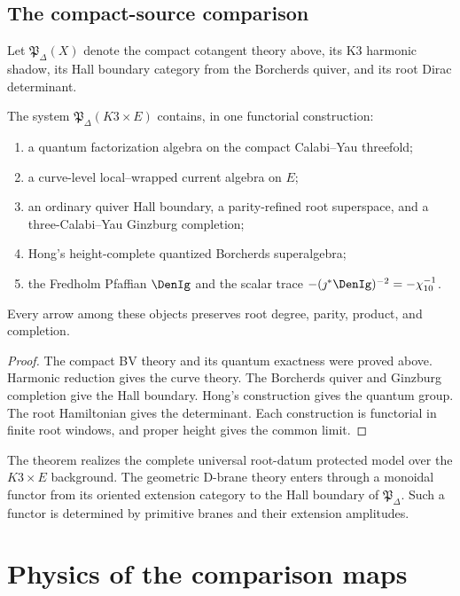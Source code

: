 \chapter{The compact-source comparison}
Let $\mathfrak P_\Delta(X)$ denote the compact cotangent theory above, its K3 harmonic shadow, its Hall boundary category from the Borcherds quiver, and its root Dirac determinant.

\begin{theorem}
The system $\mathfrak P_\Delta(K3\times E)$ contains, in one functorial construction:
\begin{enumerate}
\item a quantum factorization algebra on the compact Calabi--Yau threefold;
\item a curve-level local--wrapped current algebra on $E$;
\item an ordinary quiver Hall boundary, a parity-refined root superspace, and a three-Calabi--Yau Ginzburg completion;
\item Hong's height-complete quantized Borcherds superalgebra;
\item the Fredholm Pfaffian $\DenIg$ and the scalar trace $-(\jmath^*\DenIg)^{-2}=-\chi_{10}^{-1}$.
\end{enumerate}
Every arrow among these objects preserves root degree, parity, product, and completion.
\end{theorem}
\begin{proof}
The compact BV theory and its quantum exactness were proved above.  Harmonic reduction gives the curve theory.  The Borcherds quiver and Ginzburg completion give the Hall boundary.  Hong's construction gives the quantum group.  The root Hamiltonian gives the determinant.  Each construction is functorial in finite root windows, and proper height gives the common limit.
\end{proof}

The theorem realizes the complete universal root-datum protected model over the $K3\times E$ background.  The geometric D-brane theory enters through a monoidal functor from its oriented extension category to the Hall boundary of $\mathfrak P_\Delta$.  Such a functor is determined by primitive branes and their extension amplitudes.


\part[Physics]{Physics of the comparison maps}

